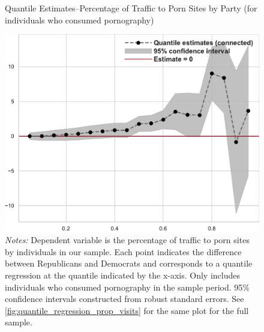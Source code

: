 \documentclass[12pt, letterpaper]{article}
\begin{document}
\begin{figure}
	\centering
	\caption{Quantile Estimates--Percentage of Traffic to Porn Sites by Party (for individuals who consumed pornography)}
	\includegraphics[width=.55\linewidth]{../figs/quantile_reg_nonzero_proportion_visits_adult.pdf}
	\caption*{\footnotesize \emph{Notes:} 
		Dependent variable is the percentage of traffic to porn sites by individuals in our sample.
		Each point indicates the difference between Republicans and Democrats and corresponds to a quantile regression at the quantile indicated by the x-axis.
		Only includes individuals who consumed pornography in the sample period.
		95\% confidence intervals constructed from robust standard errors.
		See \cref{fig:quantile_regression_prop_visits} for the same plot for the full sample.
	}
	\label{fig:quantile_regression_prop_visits_nonzeroes}
\end{figure}
\end{document}
